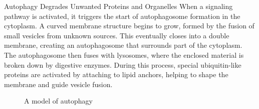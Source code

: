 \documentclass[../main.tex]{subfiles}
\begin{document}
\begin{RemarkWithTitel}{ Autophagy Degrades Unwanted Proteins and Organelles}
	When a signaling pathway is activated, it triggers the start of autophagosome formation in the cytoplasm. A curved membrane structure begins to grow, formed by the fusion of small vesicles from unknown sources. This eventually closes into a double membrane, creating an autophagosome that surrounds part of the cytoplasm. The autophagosome then fuses with lysosomes, where the enclosed material is broken down by digestive enzymes. During this process, special ubiquitin-like proteins are activated by attaching to lipid anchors, helping to shape the membrane and guide vesicle fusion.
\end{RemarkWithTitel}

\begin{figure}[H]
	\centering
	\caption{A model of autophagy}
\end{figure}
\end{document}
